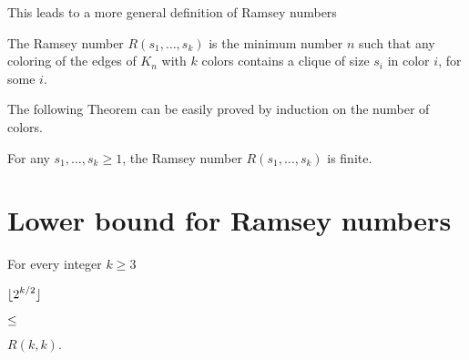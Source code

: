 \documentclass[scombinatorics.tex]{subfiles}
\begin{document}
This leads to a more general definition of Ramsey numbers

\begin{definition}
  The Ramsey number $R(s_1,\dots,s_k)$ is the minimum number $n$ such that any coloring of the edges of $K_n$ with $k$ colors contains a clique of size $s_i$ in color $i$, for some $i$.\QED
\end{definition}

The following Theorem can be easily proved by induction on the number of colors.

\begin{theorem}
  For any $s_1,\dots,s_k\ge1$, the Ramsey number $R(s_1,\dots,s_k)$ is finite.\QED
\end{theorem}

\section{Lower bound for Ramsey numbers}

\def\medrel#1{\parbox[t]{5ex}{$\displaystyle\hfil #1$}}
\def\ceq#1#2#3{\parbox[t]{35ex}{$\displaystyle #1$}\medrel{#2}{$\displaystyle #3$}}

\begin{theorem}
    For every integer $k\ge 3$
    
    \ceq{\hfill\lfloor2^{k/2}\rfloor}{\le}{R(k,k).}
\end{theorem}
\end{document}
